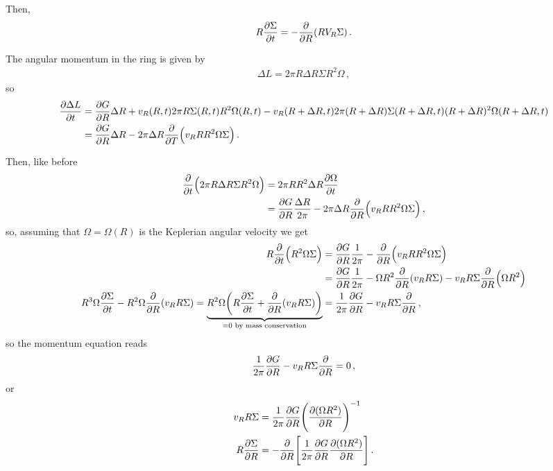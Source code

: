 \documentclass[main.tex]{subfiles}
\begin{document}
Then,  
%
\begin{align}
R \pdv{\Sigma }{t} = - \pdv{}{R} \qty(R V_R \Sigma )
\,.
\end{align}

The angular momentum in the ring is given by 
%
\begin{align}
\Delta L = 2 \pi R \Delta R \Sigma R^2 \Omega 
\,,
\end{align}
%
so 
%
\begin{align}
\pdv{\Delta L}{t}
&= \pdv{G}{R} \Delta R 
+ v_R( R, t) 2 \pi R \Sigma (R, t) R^2\Omega (R, t) 
- v_R(R + \Delta R, t) 2 \pi (R + \Delta R) \Sigma (R + \Delta R, t)( R + \Delta R)^2 \Omega (R + \Delta R, t)  \\
&= \pdv{G}{R} \Delta R - 2 \pi \Delta R \pdv{}{T} \qty(v_R R R^2 \Omega \Sigma )
\,.
\end{align}

Then, like before 
%
\begin{align}
\pdv{}{t} \qty(2 \pi R \Delta R \Sigma R^2 \Omega ) &= 2 \pi R R^2 \Delta R \pdv{\Omega }{t}   \\
&= \pdv{G}{R} \frac{\Delta R}{2 \pi }  - 2 \pi \Delta R \pdv{}{R} \qty(v_R R R^2 \Omega \Sigma )
\,,
\end{align}
%
so, assuming that \(\Omega = \Omega (R)\) is the Keplerian angular velocity we get 
%
\begin{align}
R \pdv{}{t} \qty(R^2\Omega \Sigma ) &= \pdv{G}{R} \frac{1}{2 \pi } - \pdv{}{R} \qty(v_R R R^2 \Omega \Sigma )  \\
&= \pdv{G}{R} \frac{1}{2 \pi } - \Omega R^2 \pdv{}{R} \qty(v_R R \Sigma ) - v_R R \Sigma \pdv{}{R} \qty(\Omega R^2)  \\
R^3 \Omega \pdv{\Sigma }{t} - R^2 \Omega \pdv{}{R} \qty(v_R R \Sigma ) 
= \underbrace{R^2 \Omega \qty(R \pdv{\Sigma }{t} + \pdv{}{R} \qty(v_R R \Sigma ))}_{= 0 \text{ by mass conservation}}
&= \frac{1}{2 \pi } \pdv{G}{R} - v_R R \Sigma \pdv{}{R} (\Omega R^2)
\,,
\end{align}
%
so the momentum equation reads 
%
\begin{align}
\frac{1}{2 \pi } \pdv{G}{R} - v_R R \Sigma \pdv{}{R} (\Omega R^2) = 0
\,,
\end{align}
%
or 
%
\begin{align}
v_R R \Sigma &= \frac{1}{2 \pi } \pdv{G}{R} \qty(\pdv{(\Omega R^2)}{R})^{-1}  \\
R \pdv{\Sigma }{R} &= - \pdv{}{R} \qty[ \frac{1}{2 \pi } \pdv{G}{R} \pdv{(\Omega R^2)}{R}]
\,.
\end{align}
\end{document}
